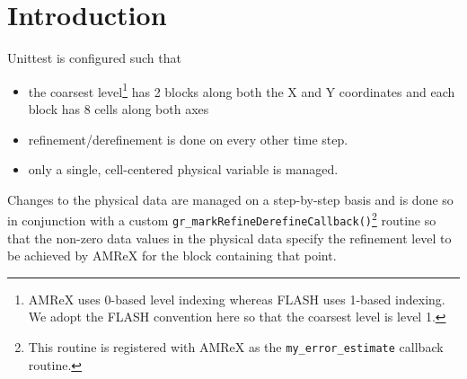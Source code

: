 \documentclass[12pt,letterpaper]{article}
\begin{document}
\setlength{\parindent}{0pt}

\section{Introduction}
Unittest is configured such that
\begin{itemize}
\item{the coarsest level\footnote{AMReX uses 0-based level indexing whereas
FLASH uses 1-based indexing.  We adopt the FLASH convention here so that the coarsest
level is level 1.} has 2 blocks along both the X and Y
coordinates and each block has 8 cells along both axes}
\item{refinement/derefinement is done on every other time step.}
\item{only a single, cell-centered physical variable is managed.}
\end{itemize}

Changes to the physical data are managed on a step-by-step basis and is done so
in conjunction with a custom
\texttt{gr\_markRefineDerefineCallback()}\footnote{This routine is registered
with AMReX as the \texttt{my\_error\_estimate} callback routine.} routine so that the
non-zero data values in the physical data specify the refinement level to be
achieved by AMReX for the block containing that point.
\end{document}
